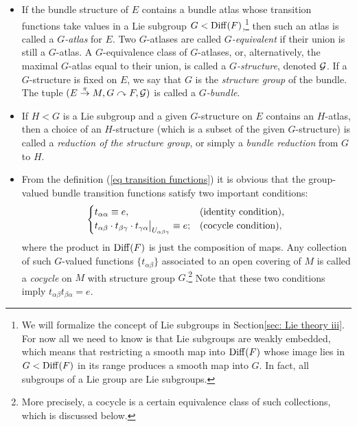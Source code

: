 \begin{defn}
\begin{itemize}
    \item If the bundle structure of $E$ contains a bundle atlas whose transition functions take values in a Lie subgroup $G<\operatorname{Diff}(F)$,\footnote{We will formalize the concept of Lie subgroups in Section\ref{sec: Lie theory iii}. For now all we need to know is that Lie subgroups are weakly embedded, which means that restricting a smooth map into $\operatorname{Diff}(F)$ whose image lies in $G<\operatorname{Diff}(F)$ in its range produces a smooth map into $G$. In fact, all subgroups of a Lie group are Lie subgroups.} then such an atlas is called a \emph{$G$-atlas} for $E$. Two $G$-atlases are called \emph{$G$-equivalent} if their union is still a $G$-atlas. A $G$-equivalence class of $G$-atlases, or, alternatively, the maximal $G$-atlas equal to their union, is called a \emph{$G$-structure}, denoted $\mathcal{G}$. If a $G$-structure is fixed on $E$, we say that $G$ is the \emph{structure group} of the bundle.  The tuple $(E\overset{\pi}{\to}M,G\curvearrowright F,\mathcal{G})$ is called a \emph{$G$-bundle}.
    
    \item If $H<G$ is a Lie subgroup and a given $G$-structure on $E$ contains an $H$-atlas, then a choice of an $H$-structure (which is a subset of the given $G$-structure) is called a \emph{reduction of the structure group}, or simply a \emph{bundle reduction} from $G$ to $H$.
    
    \item From the definition (\ref{eq transition functions}) it is obvious that the group-valued bundle transition functions satisfy two important conditions:
    \[
    \begin{cases}
    t_{\alpha\alpha}\equiv e, & \text{(identity condition),}\\
    \restr{t_{\alpha\beta}\cdot t_{\beta\gamma}\cdot t_{\gamma\alpha}}{U_{\alpha\beta\gamma}}\equiv e; & \text{(cocycle condition),}
    \end{cases}
    \]
    where the product in $\operatorname{Diff}(F)$ is just the composition of maps. Any collection of such $G$-valued functions $\{t_{\alpha\beta}\}$ associated to an open covering of $M$ is called a \emph{cocycle} on $M$ with structure group $G$.\footnote{More precisely, a cocycle is a certain equivalence class of such collections, which is discussed below.} Note that these two conditions imply $t_{\alpha\beta}t_{\beta\alpha}=e$.
\end{itemize}
\end{defn}


